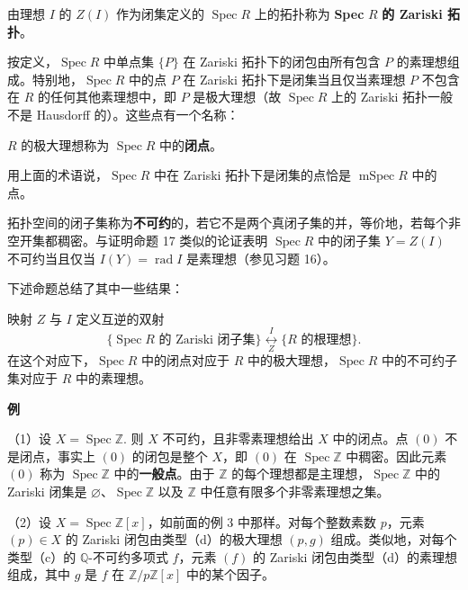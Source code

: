 \begin{definition}
由理想 \(I\) 的 \(Z(I)\) 作为闭集定义的 \(\operatorname{Spec}R\) 上的拓扑称为 \textbf{Spec} \(R\) \textbf{的 Zariski 拓扑}。
\end{definition}

按定义，\(\operatorname{Spec}R\) 中单点集 \(\{P\}\) 在 Zariski 拓扑下的闭包由所有包含 \(P\) 的素理想组成。特别地，\(\operatorname{Spec}R\) 中的点 \(P\) 在 Zariski 拓扑下是闭集当且仅当素理想 \(P\) 不包含在 \(R\) 的任何其他素理想中，即 \(P\) 是极大理想（故 \(\operatorname{Spec}R\) 上的 Zariski 拓扑一般不是 Hausdorff 的）。这些点有一个名称：

\begin{definition}
\(R\) 的极大理想称为 \(\operatorname{Spec}R\) 中的\textbf{闭点}。
\end{definition}

用上面的术语说，\(\operatorname{Spec}R\) 中在 Zariski 拓扑下是闭集的点恰是 \(\operatorname{mSpec}R\) 中的点。

拓扑空间的闭子集称为\textbf{不可约}的，若它不是两个真闭子集的并，等价地，若每个非空开集都稠密。与证明命题 17 类似的论证表明 \(\operatorname{Spec}R\) 中的闭子集 \(Y = Z(I)\) 不可约当且仅当 \(I(Y) = \operatorname{rad}I\) 是素理想（参见习题 16）。

下述命题总结了其中一些结果：

\begin{proposition}\label{pro:15.54}
映射 \(Z\) 与 \(I\) 定义互逆的双射
\[
\{\operatorname{Spec}R \text{ 的 Zariski 闭子集}\} \underset{Z}{\overset{I}{\longleftrightarrow}} \{R \text{ 的根理想}\}.
\]
在这个对应下，\(\operatorname{Spec}R\) 中的闭点对应于 \(R\) 中的极大理想，\(\operatorname{Spec}R\) 中的不可约子集对应于 \(R\) 中的素理想。
\end{proposition}

\noindent\textbf{例}

（1）设 \(X = \operatorname{Spec}\mathbb{Z}\). 则 \(X\) 不可约，且非零素理想给出 \(X\) 中的闭点。点 \((0)\) 不是闭点，事实上 \((0)\) 的闭包是整个 \(X\)，即 \((0)\) 在 \(\operatorname{Spec}\mathbb{Z}\) 中稠密。因此元素 \((0)\) 称为 \(\operatorname{Spec}\mathbb{Z}\) 中的\textbf{一般点}。由于 \(\mathbb{Z}\) 的每个理想都是主理想，\(\operatorname{Spec}\mathbb{Z}\) 中的 Zariski 闭集是 \(\varnothing\)、\(\operatorname{Spec}\mathbb{Z}\) 以及 \(\mathbb{Z}\) 中任意有限多个非零素理想之集。

（2）设 \(X = \operatorname{Spec}\mathbb{Z}[x]\)，如前面的例 3 中那样。对每个整数素数 \(p\)，元素 \((p) \in X\) 的 Zariski 闭包由类型（d）的极大理想 \((p,g)\) 组成。类似地，对每个类型（c）的 \(\mathbb{Q}\)-不可约多项式 \(f\)，元素 \((f)\) 的 Zariski 闭包由类型（d）的素理想组成，其中 \(g\) 是 \(f\) 在 \(\mathbb{Z}/p\mathbb{Z}[x]\) 中的某个因子。

